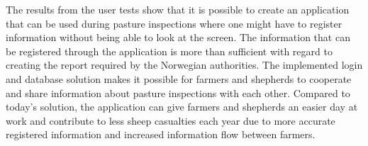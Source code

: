 \newline
\newline
The results from the user tests show that it is possible to create an application that can be used during pasture inspections where one might have to register information without being able to look at the screen. The information that can be registered through the application is more than sufficient with regard to creating the report required by the Norwegian authorities. The implemented login and database solution makes it possible for farmers and shepherds to cooperate and share information about pasture inspections with each other. Compared to today’s solution, the application can give farmers and shepherds an easier day at work and contribute to less sheep casualties each year due to more accurate registered information and increased information flow between farmers.
